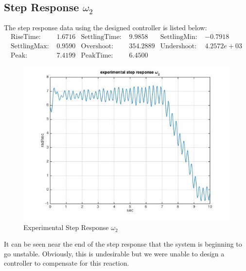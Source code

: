 \documentclass[11pt,titlepage]{article}
\begin{document}
	\subsection{Step Response $\omega_2$}
		The step response data using the designed controller is listed below:
		\begin{align*}
			\mbox{RiseTime: } &1.6716 & \mbox{SettlingTime: } &9.9858 & \mbox{SettlingMin: } &-0.7918\\
     		\mbox{SettlingMax: } &0.9590 & \mbox{Overshoot: } &354.2889 & \mbox{Undershoot: } &4.2572e+03\\
     		\mbox{Peak: } &7.4199 & \mbox{PeakTime: } &6.4500 &
     	\end{align*}
     	\begin{figure}[H]
			\centering
			\includegraphics[scale=0.5]{experStepw2}
			\caption{Experimental Step Response $\omega_2$}
		\end{figure}
		It can be seen near the end of the step response that the system is beginning to go unstable. Obviously, this is undesirable but we were unable to design a controller to compensate for this reaction.
\end{document}
